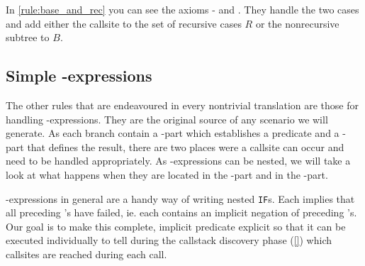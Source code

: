 In \autoref{rule:base_and_rec} you can see the axioms \RREC- and \RBASE. They handle the two cases and add either the callsite to the set of recursive cases $R$ or the nonrecursive subtree to $B$.



\subsection{Simple \CASE-expressions}

The other rules that are endeavoured in every nontrivial translation are those for handling \CASE-expressions. They are the original source of any scenario we will generate. As each branch contain a \WHEN-part which establishes a predicate and a \THEN-part that defines the result, there are two places were a callsite can occur and need to be handled appropriately. As \CASE-expressions can be nested, we will take a look at what happens when they are located in the \WHEN-part and in the \THEN-part.

\CASE-expressions in general are a handy way of writing nested \texttt{IF}s. Each \WHEN implies that all preceding \WHEN's have failed, ie. each \WHEN contains an implicit negation of preceding \WHEN's. Our goal is to make this complete, implicit predicate explicit so that it can be executed individually to tell during the callstack discovery phase (\autoref{}) which callsites are reached during each call.

